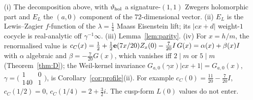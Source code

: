 \begin{theorem}\label{thm:Pstruct}
(i) The decomposition above, with $\vartheta_{\rm hol}$ a signature-$(1,1)$ Zwegers holomorphic part and $E_L$ the $(a,0)$ component of the $72$-dimensional vector.
(ii) $E_L$ is the Lewis--Zagier $f$-function of the $\lambda=\tfrac14$ Maass Eisenstein lift; its $|cx+d|$ weight-$1$ cocycle is real-analytic off $\gamma^{-1}\infty$.
(iii) Lemma~\ref{lem:parity}. (iv) For $x=h/m$, the renormalised value is $c_C(x)=\tfrac12+\tfrac12\mathbf{e}(7x/20)Z_x(0)-\tfrac7{20}I\,G(x)=\alpha(x)+\beta(x)I$ with $\alpha$ algebraic and
$\beta=-\tfrac7{20}G(x)$, which vanishes iff $2\mid m$ or $5\mid m$ (Theorem~\ref{thm:D}); the Weil-kernel invariance $G_{a,0}(\gamma x)|cx+1|=G_{a,0}(x)$,
$\gamma=\bigl(\begin{smallmatrix}1&0\\140&1\end{smallmatrix}\bigr)$, is Corollary~\ref{cor:profile}(ii). For example $c_C(0)=\tfrac{11}{20}-\tfrac7{20}I$, $c_C(1/2)=0$, $c_C(1/4)=2+\tfrac32i$.
The cusp-form $L(0)$ values do not enter.
\end{theorem}
\begin{center}\small{}\end{center}
